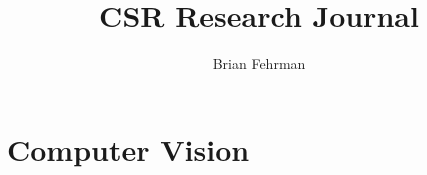 \documentclass[12pt,letterpaper]{article}
\author{Brian Fehrman}
\title{CSR Research Journal}
\begin{document}
\maketitle
\newpage

\part{Computer Vision}


\newpage


\end{document}
